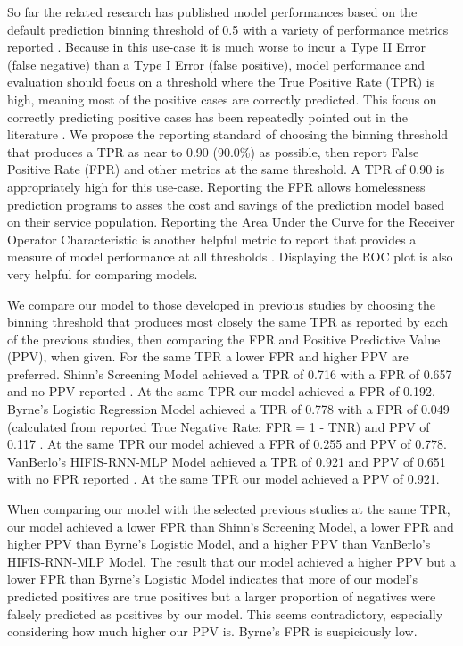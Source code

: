 \documentclass[10pt,letterpaper]{article}
\newcommand{\red}[1]{{\color{red}{#1}}}
\begin{document}
So far the related research has published model performances based on the default prediction binning threshold of 0.5 with a variety of performance metrics reported \red{Add citation}. Because in this use-case it is much worse to incur a Type II Error (false negative) than a Type I Error (false positive), model performance and evaluation should focus on a threshold where the True Positive Rate (TPR) is high, meaning most of the positive cases are correctly predicted. This focus on correctly predicting positive cases has been repeatedly pointed out in the literature \cite{vanberlo2021interpretable} \red{ADD SOURCES HERE}. We propose the reporting standard of choosing the binning threshold that produces a TPR as near to 0.90 (90.0\%) as possible, then report False Positive Rate (FPR) and other metrics at the same threshold. A TPR of 0.90 is appropriately high for this use-case. Reporting the FPR allows homelessness prediction programs to asses the cost and savings of the prediction model based on their service population. Reporting the Area Under the Curve for the Receiver Operator Characteristic is another helpful metric to report that provides a measure of model performance at all thresholds \red{Do we care about performance at other thresholds?}. Displaying the ROC plot is also very helpful for comparing models. 

We compare our model to those developed in previous studies by choosing the binning threshold that produces most closely the same TPR as reported by each of the previous studies, then comparing the FPR and Positive Predictive Value (PPV), when given. For the same TPR a lower FPR and higher PPV are preferred. Shinn's Screening Model achieved a TPR of 0.716 with a FPR of 0.657 and no PPV reported \cite{shinn2013efficient}. At the same TPR our model achieved a FPR of 0.192. Byrne's Logistic Regression Model achieved a TPR of 0.778 with a FPR of 0.049 (calculated from reported True Negative Rate: FPR = 1 - TNR) and PPV of 0.117 \cite{byrne2020classification}. At the same TPR our model achieved a FPR of 0.255 and PPV of 0.778. VanBerlo's HIFIS-RNN-MLP Model achieved a TPR of 0.921 and PPV of 0.651 with no FPR reported \cite{vanberlo2021interpretable}. At the same TPR our model achieved a PPV of 0.921.

When comparing our model with the selected previous studies at the same TPR, our model achieved a lower FPR than Shinn's Screening Model, a lower FPR and higher PPV than Byrne's Logistic Model, and a higher PPV than VanBerlo's HIFIS-RNN-MLP Model. The result that our model achieved a higher PPV but a lower FPR than Byrne's Logistic Model indicates that more of our model's predicted positives are true positives but a larger proportion of negatives were falsely predicted as positives by our model. This seems contradictory, especially considering how much higher our PPV is. Byrne's FPR is suspiciously low. \red{Rephrase previous}
\end{document}
